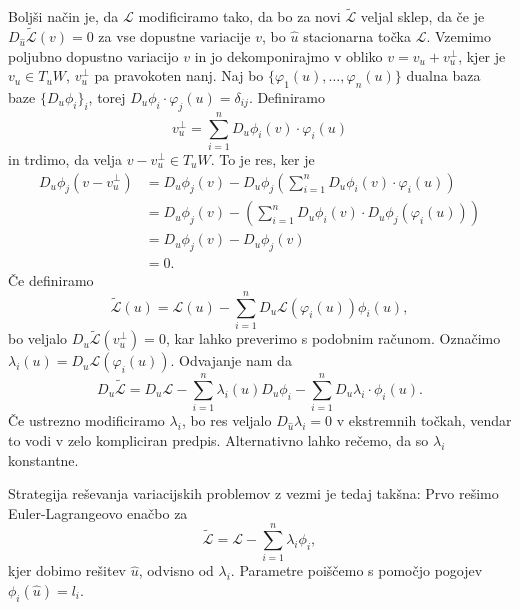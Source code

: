 Boljši način je, da $\mathcal{L}$ modificiramo tako, da bo za novi
$\tilde{\mathcal{L}}$ veljal sklep, da če je $D_{\hat{u}} \tilde{\mathcal{L}}(v)
= 0$ za vse dopustne variacije $v$, bo $\hat{u}$ stacionarna točka
$\mathcal{L}$.
Vzemimo poljubno dopustno variacijo $v$ in jo dekomponirajmo v obliko $v = v_u +
v_u^\bot$, kjer je $v_u \in T_u W$, $v_u^\bot$ pa pravokoten nanj.
Naj bo $\{\varphi_1(u), \ldots, \varphi_n(u)\}$ dualna baza baze $\{D_u
\phi_i\}_i$, torej $D_u \phi_i \cdot \varphi_j(u) = \delta_{ij}$.
Definiramo
\[
  v_u^\bot = \sum_{i=1}^n D_u \phi_i(v) \cdot \varphi_i(u)
\]
in trdimo, da velja $v - v_u^\bot \in T_u W$.
To je res, ker je
\begin{align*}
  D_u \phi_j(v - v_u^\bot)
  &= D_u \phi_j(v) - D_u \phi_j \left( \sum_{i=1}^n D_u \phi_i (v) \cdot \varphi_i(u) \right) \\
  &= D_u \phi_j(v) - \left( \sum_{i=1}^n D_u \phi_i (v) \cdot D_u \phi_j(\varphi_i(u)) \right) \\
  &= D_u \phi_j(v) - D_u \phi_j(v) \\
  &= 0.
\end{align*}
Če definiramo
\[
  \tilde{\mathcal{L}}(u) = \mathcal{L}(u) - \sum_{i=1}^n D_u \mathcal{L}
  (\varphi_i(u)) \phi_i(u),
\]
bo veljalo $D_u \tilde{\mathcal{L}} (v_u^\bot) = 0$, kar lahko preverimo s
podobnim računom.
Označimo $\lambda_i(u) = D_u \mathcal{L}(\varphi_i(u))$.
Odvajanje nam da
\[
  D_u \tilde{\mathcal{L}} = D_u \mathcal{L} - \sum_{i=1}^n \lambda_i(u) D_u
  \phi_i - \sum_{i=1}^n D_u \lambda_i \cdot \phi_i(u).
\]
Če ustrezno modificiramo $\lambda_i$, bo res veljalo $D_{\hat{u}} \lambda_i = 0$
v ekstremnih točkah, vendar to vodi v zelo kompliciran predpis.
Alternativno lahko rečemo, da so $\lambda_i$ konstantne.


Strategija reševanja variacijskih problemov z vezmi je tedaj takšna:
Prvo rešimo Euler-Lagrangeovo enačbo za
\[
  \tilde{\mathcal{L}} = \mathcal{L} - \sum_{i=1}^n \lambda_i \phi_i,
\]
kjer dobimo rešitev $\hat{u}$, odvisno od $\lambda_i$.
Parametre poiščemo s pomočjo pogojev $\phi_i(\hat{u}) = l_i$.

